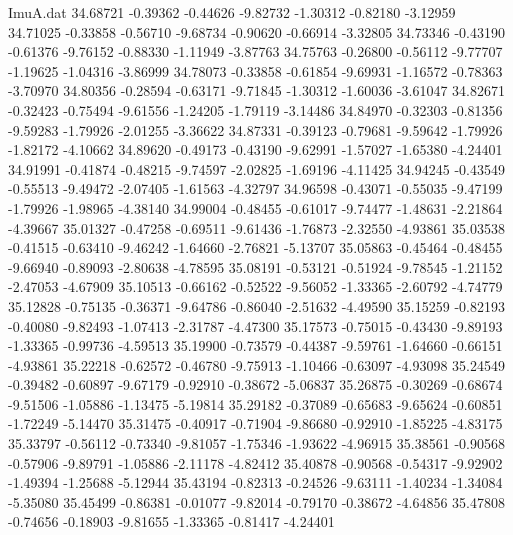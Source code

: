 \begin{filecontents}{ImuA.dat}
  34.68721   -0.39362   -0.44626   -9.82732   -1.30312   -0.82180   -3.12959
  34.71025   -0.33858   -0.56710   -9.68734   -0.90620   -0.66914   -3.32805
  34.73346   -0.43190   -0.61376   -9.76152   -0.88330   -1.11949   -3.87763
  34.75763   -0.26800   -0.56112   -9.77707   -1.19625   -1.04316   -3.86999
  34.78073   -0.33858   -0.61854   -9.69931   -1.16572   -0.78363   -3.70970
  34.80356   -0.28594   -0.63171   -9.71845   -1.30312   -1.60036   -3.61047
  34.82671   -0.32423   -0.75494   -9.61556   -1.24205   -1.79119   -3.14486
  34.84970   -0.32303   -0.81356   -9.59283   -1.79926   -2.01255   -3.36622
  34.87331   -0.39123   -0.79681   -9.59642   -1.79926   -1.82172   -4.10662
  34.89620   -0.49173   -0.43190   -9.62991   -1.57027   -1.65380   -4.24401
  34.91991   -0.41874   -0.48215   -9.74597   -2.02825   -1.69196   -4.11425
  34.94245   -0.43549   -0.55513   -9.49472   -2.07405   -1.61563   -4.32797
  34.96598   -0.43071   -0.55035   -9.47199   -1.79926   -1.98965   -4.38140
  34.99004   -0.48455   -0.61017   -9.74477   -1.48631   -2.21864   -4.39667
  35.01327   -0.47258   -0.69511   -9.61436   -1.76873   -2.32550   -4.93861
  35.03538   -0.41515   -0.63410   -9.46242   -1.64660   -2.76821   -5.13707
  35.05863   -0.45464   -0.48455   -9.66940   -0.89093   -2.80638   -4.78595
  35.08191   -0.53121   -0.51924   -9.78545   -1.21152   -2.47053   -4.67909
  35.10513   -0.66162   -0.52522   -9.56052   -1.33365   -2.60792   -4.74779
  35.12828   -0.75135   -0.36371   -9.64786   -0.86040   -2.51632   -4.49590
  35.15259   -0.82193   -0.40080   -9.82493   -1.07413   -2.31787   -4.47300
  35.17573   -0.75015   -0.43430   -9.89193   -1.33365   -0.99736   -4.59513
  35.19900   -0.73579   -0.44387   -9.59761   -1.64660   -0.66151   -4.93861
  35.22218   -0.62572   -0.46780   -9.75913   -1.10466   -0.63097   -4.93098
  35.24549   -0.39482   -0.60897   -9.67179   -0.92910   -0.38672   -5.06837
  35.26875   -0.30269   -0.68674   -9.51506   -1.05886   -1.13475   -5.19814
  35.29182   -0.37089   -0.65683   -9.65624   -0.60851   -1.72249   -5.14470
  35.31475   -0.40917   -0.71904   -9.86680   -0.92910   -1.85225   -4.83175
  35.33797   -0.56112   -0.73340   -9.81057   -1.75346   -1.93622   -4.96915
  35.38561   -0.90568   -0.57906   -9.89791   -1.05886   -2.11178   -4.82412
  35.40878   -0.90568   -0.54317   -9.92902   -1.49394   -1.25688   -5.12944
  35.43194   -0.82313   -0.24526   -9.63111   -1.40234   -1.34084   -5.35080
  35.45499   -0.86381   -0.01077   -9.82014   -0.79170   -0.38672   -4.64856
  35.47808   -0.74656   -0.18903   -9.81655   -1.33365   -0.81417   -4.24401

\end{filecontents}
